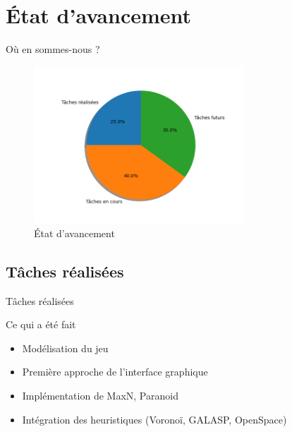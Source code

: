 \documentclass{beamer}
\begin{document}
    \section{État d'avancement}
    \begin{frame}{Où en sommes-nous ?}
        \begin{center}
            \begin{figure}
                \includegraphics[width=0.7\textwidth]{Images/etat-avancement}
                \caption{État d'avancement}
            \end{figure}
        \end{center}
    \end{frame}
    \subsection*{Tâches réalisées}
    \begin{frame}{Tâches réalisées}
        \begin{block}{Ce qui a été fait}
            \begin{itemize}
                \item Modélisation du jeu
                \item Première approche de l'interface graphique
                \item Implémentation de MaxN, Paranoid
                \item Intégration des heuristiques (Voronoï, GALASP, OpenSpace)
            \end{itemize}
        \end{block}
    \end{frame}
\end{document}
